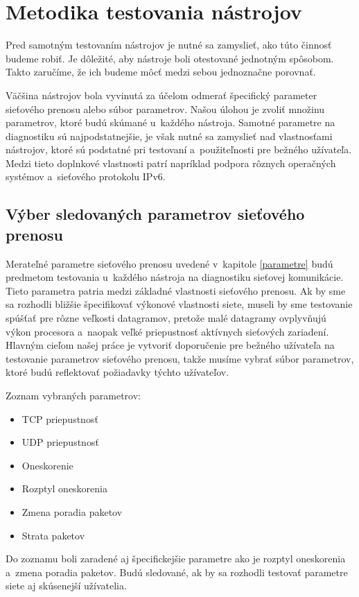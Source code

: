 \chapter{Metodika testovania nástrojov} \label{metodika}
Pred samotným testovaním nástrojov je nutné sa zamyslieť, ako túto
činnosť budeme robiť. Je dôležité, aby nástroje boli otestované jednotným 
spôsobom. Takto zaručíme, že ich budeme môcť medzi sebou jednoznačne porovnať.

Väčšina nástrojov bola vyvinutá za účelom odmerať
špecifický parameter sieťového prenosu alebo súbor parametrov. Našou úlohou 
je zvoliť množinu parametrov, ktoré budú skúmané u~každého nástroja.
Samotné parametre na diagnostiku sú najpodstatnejšie, je však 
nutné sa zamyslieť nad vlastnosťami nástrojov, ktoré sú podstatné pri
testovaní a~použiteľnosti pre bežného užívateľa. Medzi tieto doplnkové
vlastnosti patrí napríklad podpora rôznych operačných systémov a~sieťového
protokolu IPv6.

\section{Výber sledovaných parametrov sieťového prenosu} \label{metodika_parametre}
Merateľné parametre sieťového prenosu uvedené v~kapitole \ref{parametre} budú 
predmetom testovania u~každého nástroja na diagnostiku sieťovej komunikácie.
Tieto parametra patria medzi základné vlastnosti sieťového prenosu. Ak by sme sa 
rozhodli bližšie špecifikovať výkonové vlastnosti siete, museli by sme testovanie 
spúšťať pre rôzne veľkosti datagramov, pretože malé datagramy ovplyvňujú výkon procesora
a~naopak veľké priepustnosť aktívnych sieťových zariadení.
Hlavným cieľom našej práce je vytvoriť doporučenie pre bežného užívateľa na
testovanie parametrov sieťového prenosu, takže
musíme vybrať súbor parametrov, ktoré budú reflektovať požiadavky týchto užívateľov.

\noindent Zoznam vybraných parametrov:
\begin{itemize}
    \item TCP priepustnosť
    \item UDP priepustnosť
    \item Oneskorenie
    \item Rozptyl oneskorenia
    \item Zmena poradia paketov
    \item Strata paketov
\end{itemize}

Do zoznamu boli zaradené aj špecifickejšie parametre ako je rozptyl oneskorenia
a~zmena poradia paketov. Budú sledované, ak by sa rozhodli testovať parametre
siete aj skúsenejší užívatelia. 

